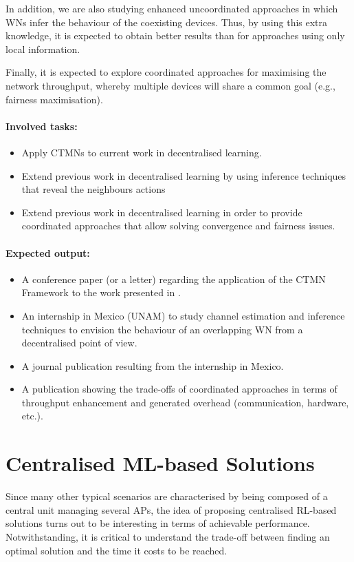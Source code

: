 \documentclass[12pt, a4paper,twoside]{tesi_upf}
\begin{document}
			In addition, we are also studying enhanced uncoordinated approaches in which WNs infer the behaviour of the coexisting devices. Thus, by using this extra knowledge, it is expected to obtain better results than for approaches using only local information. 
				
			Finally, it is expected to explore coordinated approaches for maximising the network throughput, whereby multiple devices will share a common goal (e.g., fairness maximisation). 
				
			\paragraph{Involved tasks:}		
			\begin{itemize}
				\item Apply CTMNs to current work in decentralised learning.
				\item Extend previous work in decentralised learning by using inference techniques that reveal the neighbours actions
				\item Extend previous work in decentralised learning in order to provide coordinated approaches that allow solving convergence and fairness issues.
			\end{itemize}	
		
			\paragraph{Expected output:}		
			\begin{itemize}
				\item A conference paper (or a letter) regarding the application of the CTMN Framework to the work presented in \cite{wilhelmi2017implications}. 
				\item An internship in Mexico (UNAM) to study channel estimation and inference techniques to envision the behaviour of an overlapping WN from a decentralised point of view.
				\item A journal publication resulting from the internship in Mexico.
				\item A publication showing the trade-offs of coordinated approaches in terms of throughput enhancement and generated overhead (communication, hardware, etc.).
			\end{itemize}		

		\section{Centralised ML-based Solutions}
		\label{section:contribution4}		
			Since many other typical scenarios are characterised by being composed of a central unit managing several APs, the idea of proposing centralised RL-based solutions turns out to be interesting in terms of achievable performance. Notwithstanding, it is critical to understand the trade-off between finding an optimal solution and the time it costs to be reached.
			
\end{document}
